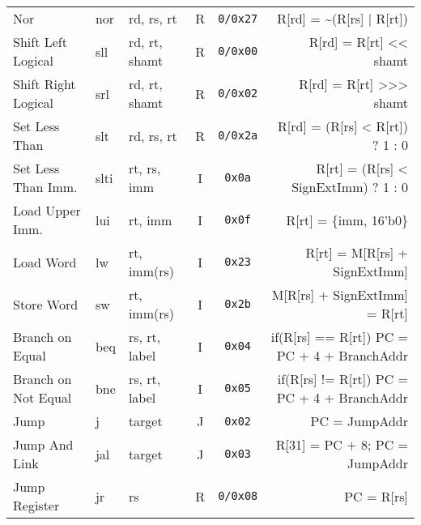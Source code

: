 \begin{tabularx}{\textwidth}{lMAccD}
	Nor                                                      & nor  & rd, rs, rt    & R & \texttt{0/0x27} & R[rd] = \textasciitilde (R[rs] | R[rt])                                         \\
	Shift Left Logical                                       & sll  & rd, rt, shamt & R & \texttt{0/0x00} & R[rd] = R[rt] <{}< shamt                                                        \\
	Shift Right Logical                                      & srl  & rd, rt, shamt & R & \texttt{0/0x02} & R[rd] = R[rt] >{}>{}> shamt                                                     \\
	Set Less Than                                            & slt  & rd, rs, rt    & R & \texttt{0/0x2a} & R[rd] = (R[rs] < R[rt]) ? 1 : 0                                                 \\
	Set Less Than Imm.                                       & slti & rt, rs, imm   & I & \texttt{0x0a}   & R[rt] = (R[rs] < SignExtImm) ? 1 : 0           \footnotemark[2]                 \\
	Load Upper Imm.                                          & lui  & rt, imm       & I & \texttt{0x0f}   & R[rt] = \{imm, 16'b0\}                                                          \\
	Load Word                                                & lw   & rt, imm(rs)   & I & \texttt{0x23}   & R[rt] = M[R[rs] + SignExtImm]                  \footnotemark[2]                 \\
	Store Word                                               & sw   & rt, imm(rs)   & I & \texttt{0x2b}   & M[R[rs] + SignExtImm] = R[rt]                  \footnotemark[2]                 \\
	Branch on Equal                                          & beq  & rs, rt, label & I & \texttt{0x04}   & if(R[rs] == R[rt]) PC = PC + 4 + BranchAddr    \footnotemark[4]                 \\
	Branch on Not Equal                                      & bne  & rs, rt, label & I & \texttt{0x05}   & if(R[rs] != R[rt]) PC = PC + 4 + BranchAddr    \footnotemark[4]                 \\
	Jump                                                     & j    & target        & J & \texttt{0x02}   & PC = JumpAddr                                  \footnotemark[5]                 \\
	Jump And Link                                            & jal  & target        & J & \texttt{0x03}   & R[31] = PC + 8; PC = JumpAddr                  \footnotemark[5]                 \\
	Jump Register                                            & jr   & rs            & R & \texttt{0/0x08} & PC = R[rs]                                                                      \\
	\bottomrule
\end{tabularx}
